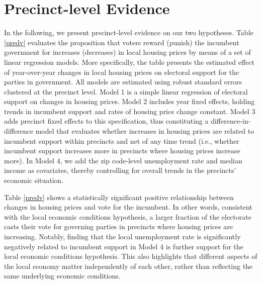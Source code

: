 \documentclass[12pt,a4paper]{article}
\begin{document}
	\section{Precinct-level Evidence} \label{inference}
	In the following, we present precinct-level evidence on our two hypotheses. Table \ref{predv} evaluates the proposition that voters reward (punish) the incumbent government for increases (decreases) in local housing prices by means of a set of linear regression models. More specifically, the table presents the estimated effect of year-over-year changes in local housing prices on electoral support for the parties in government. All models are estimated using robust standard errors clustered at the precinct level. Model 1 is a simple linear regression of electoral support on changes in housing prices. Model 2 includes year fixed effects, holding trends in incumbent support and rates of housing price change constant. Model 3 adds precinct fixed effects to this specification, thus constituting a difference-in-difference model that evaluates whether increases in housing prices are related to incumbent support within precincts and net of any time trend (i.e., whether incumbent support increases more in precincts where housing prices increase more). In Model 4, we add the zip code-level unemployment rate and median income as covariates, thereby controlling for overall trends in the precincts’ economic situation. 
	
	
	
	Table \ref{predv} shows a statistically significant positive relationship between changes in housing prices and vote for the incumbent. In other words, consistent with the local economic conditions hypothesis, a larger fraction of the electorate casts their vote for governing parties in precincts where housing prices are increasing. 
	Notably, finding that the local unemployment rate is significantly negatively related to incumbent support in Model 4 is further support for the local economic conditions hypothesis. This also highlights that different aspects of the local economy matter independently of each other, rather than reflecting the same underlying economic conditions.
	
\end{document}
